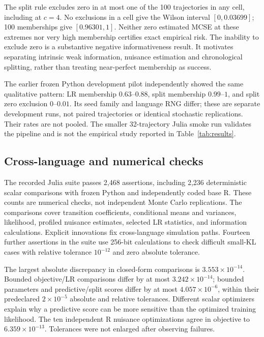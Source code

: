 \documentclass[11pt]{article}
\begin{document}
The split rule excludes zero in at most one of the 100 trajectories in any cell,
including at $c=4$. No exclusions in a cell give the Wilson interval
$[0,0.03699]$; 100 memberships give $[0.96301,1]$. Neither zero estimated MCSE
at these extremes nor very high membership certifies exact empirical risk.
The inability to exclude zero is a substantive negative informativeness result.
It motivates separating intrinsic weak information, nuisance estimation and
chronological splitting, rather than treating near-perfect membership as success.

The earlier frozen Python development pilot independently showed the same
qualitative pattern: LR membership $0.63$--$0.88$, split membership $0.99$--$1$,
and split zero exclusion $0$--$0.01$. Its seed family and language RNG differ;
these are separate development runs, not paired trajectories or identical
stochastic replications. Their rates are not pooled. The smaller 32-trajectory
Julia smoke run validates the pipeline and is not the empirical study reported
in Table~\ref{tab:results}.

\subsection{Cross-language and numerical checks}
The recorded Julia suite passes 2,468 assertions, including 2,236 deterministic
scalar comparisons with frozen Python and independently coded base R. These
counts are numerical checks, not independent Monte Carlo replications. The
comparisons cover transition coefficients, conditional means and variances,
likelihood, profiled nuisance estimates, selected LR statistics, and information
calculations. Explicit innovations fix cross-language simulation paths.
Fourteen further assertions in the suite use 256-bit calculations to check
difficult small-KL cases with
relative tolerance $10^{-12}$ and zero absolute tolerance.

The largest absolute discrepancy in closed-form comparisons is
$3.553\times10^{-14}$. Bounded objective/LR comparisons differ by at most
$3.242\times10^{-14}$; bounded parameters and predictive/split scores differ by
at most $4.057\times10^{-6}$, within their predeclared $2\times10^{-5}$ absolute
and relative tolerances. Different scalar optimizers explain why a predictive
score can be more sensitive than the optimized training likelihood. The ten
independent R nuisance optimizations agree in objective to
$6.359\times10^{-13}$. Tolerances were not enlarged after observing failures.
\end{document}
